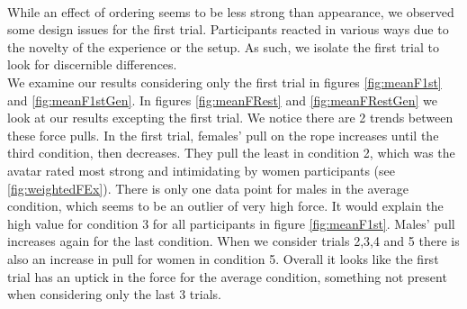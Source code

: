\\
 While an effect of ordering seems to be less strong than appearance, we observed some design issues for the first trial. Participants reacted in various ways due to the novelty of the experience or the setup. As such, we isolate the first trial to look for discernible differences.
 \\
 We examine our results considering only the first trial in figures  \ref{fig:meanF1st} and \ref{fig:meanF1stGen}. In figures \ref{fig:meanFRest} and \ref{fig:meanFRestGen} we look at our results excepting the first trial.  We notice there are 2 trends between these force pulls. In the first trial, females' pull on the rope increases until the third condition, then decreases. They pull the least in condition 2, which was the avatar rated most strong and intimidating by women participants (see \ref{fig:weightedFEx}). There is only one data point for males in the average condition, which seems to be an outlier of very high force. It would explain the high value for condition 3 for all participants in figure \ref{fig:meanF1st}. Males' pull increases again for the last condition. When we consider trials 2,3,4 and 5 there is also an increase in pull for women in condition 5. Overall it looks like the first trial has an uptick in the force for the average condition, something not present when considering only the last 3 trials.\\


